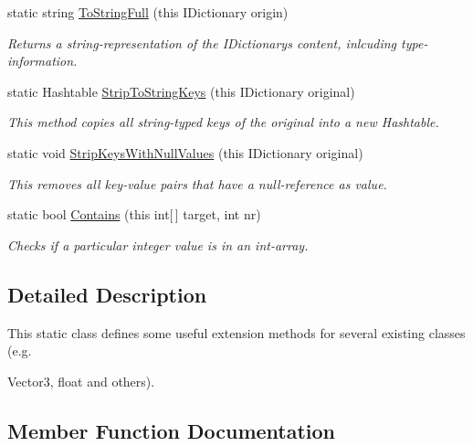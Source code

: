 \begin{DoxyCompactItemize}
static string \hyperlink{class_extensions_a646282c077a078cdaeab9184809c2e76}{To\+String\+Full} (this I\+Dictionary origin)
\begin{DoxyCompactList}\small\item\em Returns a string-\/representation of the I\+Dictionary\textquotesingle{}s content, inlcuding type-\/information. \end{DoxyCompactList}\item 
static Hashtable \hyperlink{class_extensions_a59cc48f36f7bf9a0ae0f8efefff91a74}{Strip\+To\+String\+Keys} (this I\+Dictionary original)
\begin{DoxyCompactList}\small\item\em This method copies all string-\/typed keys of the original into a new Hashtable. \end{DoxyCompactList}\item 
static void \hyperlink{class_extensions_a733a7e102e781cf0879e96d535bbd2d8}{Strip\+Keys\+With\+Null\+Values} (this I\+Dictionary original)
\begin{DoxyCompactList}\small\item\em This removes all key-\/value pairs that have a null-\/reference as value. \end{DoxyCompactList}\item 
static bool \hyperlink{class_extensions_ac89906aaca1f1603398873874d981417}{Contains} (this int\mbox{[}$\,$\mbox{]} target, int nr)
\begin{DoxyCompactList}\small\item\em Checks if a particular integer value is in an int-\/array. \end{DoxyCompactList}\end{DoxyCompactItemize}


\subsection{Detailed Description}
This static class defines some useful extension methods for several existing classes (e.\+g. 

Vector3, float and others). 

\subsection{Member Function Documentation}
